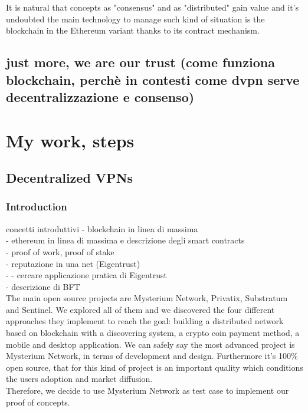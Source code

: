 \documentclass[]{article}
\begin{document}
	It is natural that concepts as "consensus" and as "distributed" gain value and it's undoubted the main technology to manage such kind of situation is the blockchain in the Ethereum variant thanks to its contract mechanism.\\
	
	\subsection{just more, we are our trust (come funziona blockchain, perchè in contesti come dvpn serve decentralizzazione e consenso)}
	
	\section{My work, steps}
	\subsection{Decentralized VPNs}
	\subsubsection{Introduction}
		
	concetti introduttivi
	- blockchain in linea di massima\\
	- ethereum in linea di massima e descrizione degli smart contracts\\
	- proof of work, proof of stake\\
	- reputazione in una net (Eigentrust)\\
	- - cercare applicazione pratica di Eigentrust\\
	- descrizione di BFT\\
	
	The main open source projects are Mysterium Network, Privatix, Substratum and Sentinel. We explored all of them and we discovered the four different approaches they implement to reach the goal: building a distributed network based on blockchain with a discovering system, a crypto coin payment method, a mobile and desktop application. We can safely say the most advanced project is Mysterium Network, in terms of development and design. Furthermore it's 100\% open source, that for this kind of project is an important quality which conditions the users adoption and market diffusion.\\
	Therefore, we decide to use Mysterium Network as test case to implement our proof of concepts.\\
	
\end{document}
